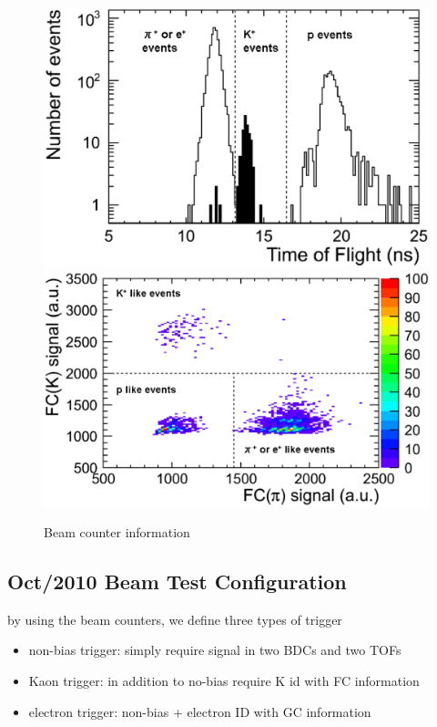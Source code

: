 \begin{figure}[htbp]
  \begin{center}
    \includegraphics[width=1.0\hsize,clip]{fig/TOF_cut.eps}
    \includegraphics[width=1.0\hsize,clip]{fig/FC_KPI.eps}
  \end{center}
 \caption{Beam counter information}
 \label{fig:BeamCounters}
\end{figure}

\subsection{Oct/2010 Beam Test Configuration}

by using the beam counters, we define three types of trigger
\begin{itemize}
\item non-bias trigger:  simply require signal in two BDCs and two TOFs
\item Kaon trigger:  in addition to no-bias require K id with FC information  
\item electron trigger: non-bias + electron ID with GC information
\end{itemize}

